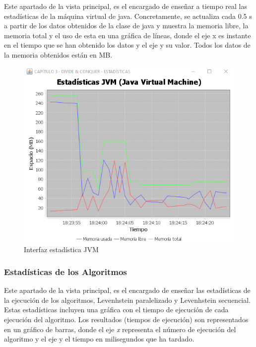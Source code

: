Este apartado de la vista principal, es el encargado de enseñar a tiempo real las estadísticas de la máquina virtual de java. Concretamente, se actualiza cada 0.5 s a partir de los datos obtenidos de la clase de java  y muestra la memoria libre, la memoria total y el uso de esta en una gráfica de líneas, donde el eje x es instante en el tiempo que se han obtenido los datos y el eje y su valor. Todos los datos de la memoria obtenidos están en MB.

\begin{figure}[!h]
    \centering
    \includegraphics[width=\linewidth]{MVC/View/img/stats-jvm.png}
    \caption{Interfaz estadística JVM}
    \label{fig:Ejemplo stats JVM}
\end{figure}

\subsubsection{Estadísticas de los Algoritmos}\label{Stats Algt}

Este apartado de la vista principal, es el encargado de enseñar las estadísticas de la ejecución de los algoritmos, Levenhstein paralelizado y Levenhstein secuencial. Estas estadísticas incluyen una gráfica con el tiempo de ejecución de cada ejecución del algoritmo. Los resultados (tiempos de ejecución) son representados en un gráfico de barras, donde el eje \textit{x} representa el número de ejecución del algoritmo y el eje y el tiempo en milisegundos que ha tardado.

